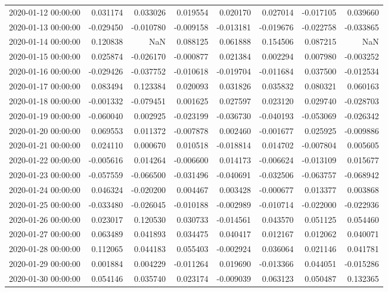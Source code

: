 \begin{tabular}{lrrrrrrr}
2020-01-12 00:00:00 & 0.031174 & 0.033026 & 0.019554 & 0.020170 & 0.027014 & -0.017105 & 0.039660 \\
2020-01-13 00:00:00 & -0.029450 & -0.010780 & -0.009158 & -0.013181 & -0.019676 & -0.022758 & -0.033865 \\
2020-01-14 00:00:00 & 0.120838 & NaN & 0.088125 & 0.061888 & 0.154506 & 0.087215 & NaN \\
2020-01-15 00:00:00 & 0.025874 & -0.026170 & -0.000877 & 0.021384 & 0.002294 & 0.007980 & -0.003252 \\
2020-01-16 00:00:00 & -0.029426 & -0.037752 & -0.010618 & -0.019704 & -0.011684 & 0.037500 & -0.012534 \\
2020-01-17 00:00:00 & 0.083494 & 0.123384 & 0.020093 & 0.031826 & 0.035832 & 0.080321 & 0.060163 \\
2020-01-18 00:00:00 & -0.001332 & -0.079451 & 0.001625 & 0.027597 & 0.023120 & 0.029740 & -0.028703 \\
2020-01-19 00:00:00 & -0.060040 & 0.002925 & -0.023199 & -0.036730 & -0.040193 & -0.053069 & -0.026342 \\
2020-01-20 00:00:00 & 0.069553 & 0.011372 & -0.007878 & 0.002460 & -0.001677 & 0.025925 & -0.009886 \\
2020-01-21 00:00:00 & 0.024110 & 0.000670 & 0.010518 & -0.018814 & 0.014702 & -0.007804 & 0.005605 \\
2020-01-22 00:00:00 & -0.005616 & 0.014264 & -0.006600 & 0.014173 & -0.006624 & -0.013109 & 0.015677 \\
2020-01-23 00:00:00 & -0.057559 & -0.066500 & -0.031496 & -0.040691 & -0.032506 & -0.063757 & -0.068942 \\
2020-01-24 00:00:00 & 0.046324 & -0.020200 & 0.004467 & 0.003428 & -0.000677 & 0.013377 & 0.003868 \\
2020-01-25 00:00:00 & -0.033480 & -0.026045 & -0.010188 & -0.002989 & -0.010714 & -0.022000 & -0.022936 \\
2020-01-26 00:00:00 & 0.023017 & 0.120530 & 0.030733 & -0.014561 & 0.043570 & 0.051125 & 0.054460 \\
2020-01-27 00:00:00 & 0.063489 & 0.041893 & 0.034475 & 0.040417 & 0.012167 & 0.012062 & 0.040071 \\
2020-01-28 00:00:00 & 0.112065 & 0.044183 & 0.055403 & -0.002924 & 0.036064 & 0.021146 & 0.041781 \\
2020-01-29 00:00:00 & 0.001884 & 0.004229 & -0.011264 & 0.019690 & -0.013366 & 0.044051 & -0.015286 \\
2020-01-30 00:00:00 & 0.054146 & 0.035740 & 0.023174 & -0.009039 & 0.063123 & 0.050487 & 0.132365 \\

\end{tabular}
